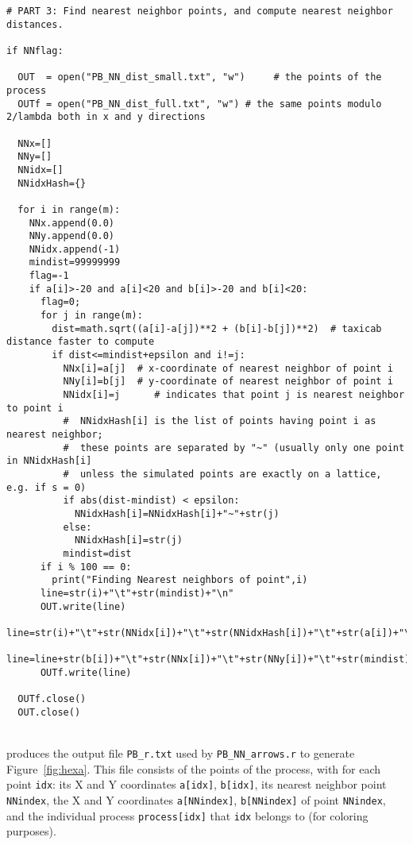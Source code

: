 \documentclass[10pt]{article}
\begin{document}
\begin{lstlisting}
# PART 3: Find nearest neighbor points, and compute nearest neighbor distances.

if NNflag:

  OUT  = open("PB_NN_dist_small.txt", "w")     # the points of the process 
  OUTf = open("PB_NN_dist_full.txt", "w") # the same points modulo 2/lambda both in x and y directions

  NNx=[]
  NNy=[]
  NNidx=[]
  NNidxHash={}

  for i in range(m):
    NNx.append(0.0)
    NNy.append(0.0)
    NNidx.append(-1)
    mindist=99999999
    flag=-1
    if a[i]>-20 and a[i]<20 and b[i]>-20 and b[i]<20: 
      flag=0;
      for j in range(m):
        dist=math.sqrt((a[i]-a[j])**2 + (b[i]-b[j])**2)  # taxicab distance faster to compute
        if dist<=mindist+epsilon and i!=j: 
          NNx[i]=a[j]  # x-coordinate of nearest neighbor of point i
          NNy[i]=b[j]  # y-coordinate of nearest neighbor of point i
          NNidx[i]=j      # indicates that point j is nearest neighbor to point i
          #  NNidxHash[i] is the list of points having point i as nearest neighbor;
          #  these points are separated by "~" (usually only one point in NNidxHash[i]
          #  unless the simulated points are exactly on a lattice, e.g. if s = 0)
          if abs(dist-mindist) < epsilon: 
            NNidxHash[i]=NNidxHash[i]+"~"+str(j) 
          else:    
            NNidxHash[i]=str(j) 
          mindist=dist 
      if i % 100 == 0: 
        print("Finding Nearest neighbors of point",i)
      line=str(i)+"\t"+str(mindist)+"\n"
      OUT.write(line) 
      line=str(i)+"\t"+str(NNidx[i])+"\t"+str(NNidxHash[i])+"\t"+str(a[i])+"\t" 
      line=line+str(b[i])+"\t"+str(NNx[i])+"\t"+str(NNy[i])+"\t"+str(mindist)+"\n"
      OUTf.write(line) 

  OUTf.close()
  OUT.close()
\end{lstlisting}
\quad \\
 produces the output file \texttt{PB\_r.txt} used by \texttt{PB\_NN\_arrows.r} to generate Figure~\ref{fig:hexa}.
This file consists of the points of the process, with for each point \texttt{idx}:  
its X and Y coordinates \texttt{a[idx]}, \texttt{b[idx]}, its nearest neighbor point \texttt{NNindex}, the X and Y coordinates
\texttt{a[NNindex]}, \texttt{b[NNindex]} of point \texttt{NNindex}, and the individual process \texttt{process[idx]} that \texttt{idx} belongs to (for coloring purposes).
\end{document}
